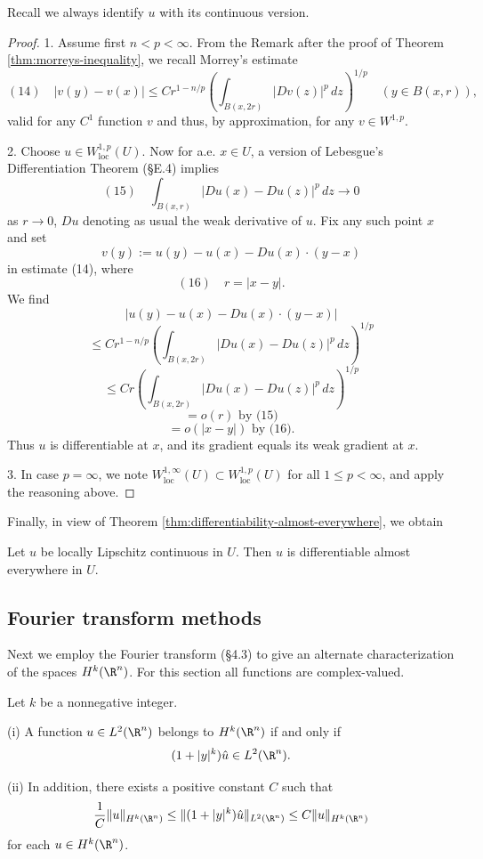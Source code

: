 Recall we always identify $u$ with its continuous version.

\begin{proof}
1. Assume first $n < p < \infty$. From the Remark after the proof of Theorem \ref{thm:morreys-inequality}, we recall Morrey's estimate
$$(14) \quad |v(y) - v(x)| \le Cr^{1-n/p} \left(\int_{B(x,2r)} |Dv(z)|^p\,dz\right)^{1/p} \quad (y \in B(x,r)),$$
valid for any $C^1$ function $v$ and thus, by approximation, for any $v \in W^{1,p}$.

2. Choose $u \in W^{1,p}_{\text{loc}}(U)$. Now for a.e. $x \in U$, a version of Lebesgue's Differentiation Theorem (§E.4) implies
$$(15) \quad \int_{B(x,r)} |Du(x) - Du(z)|^p\,dz \to 0$$
as $r \to 0$, $Du$ denoting as usual the weak derivative of $u$. Fix any such point $x$ and set
$$v(y) := u(y) - u(x) - Du(x) \cdot (y - x)$$
in estimate (14), where
$$(16) \quad r = |x - y|.$$
We find
$$|u(y) - u(x) - Du(x) \cdot (y - x)|$$
$$\le Cr^{1-n/p} \left(\int_{B(x,2r)} |Du(x) - Du(z)|^p\,dz\right)^{1/p}$$
$$\le Cr \left(\int_{B(x,2r)} |Du(x) - Du(z)|^p\,dz\right)^{1/p}$$
$$= o(r) \text{ by (15)}$$
$$= o(|x - y|) \text{ by (16)}.$$
Thus $u$ is differentiable at $x$, and its gradient equals its weak gradient at $x$.

3. In case $p = \infty$, we note $W^{1,\infty}_{\text{loc}}(U) \subset W^{1,p}_{\text{loc}}(U)$ for all $1 \le p < \infty$, and apply the reasoning above.
\end{proof}

Finally, in view of Theorem \ref{thm:differentiability-almost-everywhere}, we obtain

\begin{theorem}
\label{thm:rademachers-theorem}
Let $u$ be locally Lipschitz continuous in $U$. Then $u$ is differentiable almost everywhere in $U$.
\end{theorem}

\subsection{Fourier transform methods}

Next we employ the Fourier transform (§4.3) to give an alternate characterization of the spaces $H^k(\R^n)$. For this section all functions are complex-valued.

\begin{theorem}
\label{thm:characterization-hk-fourier-transform}
Let $k$ be a nonnegative integer.

(i) A function $u \in L^2(\R^n)$ belongs to $H^k(\R^n)$ if and only if
$$(1 + |y|^k)\hat{u} \in L^2(\R^n).$$

(ii) In addition, there exists a positive constant $C$ such that
$$\frac{1}{C}\|u\|_{H^k(\R^n)} \le \|(1 + |y|^k)\hat{u}\|_{L^2(\R^n)} \le C\|u\|_{H^k(\R^n)}$$
for each $u \in H^k(\R^n)$.
\end{theorem}

